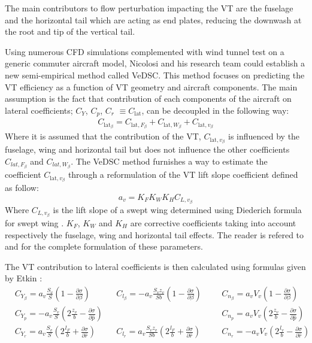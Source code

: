 The main contributors to flow perturbation impacting the VT are the fuselage and the horizontal tail which are acting as end plates, reducing the downwash at the root and tip of the vertical tail. 

Using numerous CFD simulations complemented with wind tunnel test on a generic commuter aircraft model, Nicolosi and his research team could establish a new semi-empirical method called VeDSC. This method focuses on predicting the VT efficiency as a function of VT geometry and aircraft components. The main assumption is the fact that contribution of each components of the aircraft on lateral coefficients; $C_{Y}$, $C_{p}$, $C_{r}$ $\equiv C_{\textrm{lat}}$, can be decoupled in the following way:
\begin{eqnarray}
C_{\textrm{lat}_\beta} = C_{\textrm{lat},F_\beta} + C_{\textrm{lat},W_\beta} + C_{\textrm{lat},v_\beta}
\end{eqnarray}
Where it is assumed that the contribution of the VT, $C_{\textrm{lat},v_\beta}$ is influenced by the fuselage, wing and horizontal tail but does not influence the other coefficients $C_{lat,F_\beta}$ and $C_{lat,W_\beta}$.
The VeDSC method furnishes a way to estimate the coefficient $C_{\textrm{lat},v_\beta}$ through a reformulation of the VT lift slope coefficient defined as follow:
\begin{equation}
a_v=K_F K_W K_H C_{L,v_\beta}
\end{equation}
Where $C_{L,v_\beta}$ is the lift slope of a swept wing determined using Diederich formula for swept wing \cite{DiederichPlanformParameter}. $K_F$, $K_W$ and $K_H$ are corrective coefficients taking into account respectively the fuselage, wing and horizontal tail effects. The reader is refered to \cite{NicolosiVTDesignReview} and \cite{NicolosiDirectionalStabilityReviewofEmpiricalMethod} for the complete formulation of these parameters.

The VT contribution to lateral coefficients is then calculated using formulas given by Etkin \cite{Etkin}:
\begin{align}
&C_{Y_\beta} = a_v\frac{S_v}{S}\left( 1-\frac{\partial \sigma}{\partial \beta}\right) 
&&C_{l_\beta} =-a_v\frac{S_v z_v}{S b}\left( 1-\frac{\partial \sigma}{\partial \beta}\right) 
&&&C_{n_\beta} = a_v V_v\left( 1-\frac{\partial \sigma}{\partial \beta}\right)\\
&C_{Y_p} = -a_v\frac{S_v}{S}\left(2\frac{z_v}{b}-\frac{\partial \sigma}{\partial \hat{p}}\right) && \qquad &&&C_{n_p}= a_v V_v\left(2\frac{z_v}{b}-\frac{\partial \sigma}{\partial \hat{p}}\right)\\
&C_{Y_r} = a_v\frac{S_v}{S}\left( 2\frac{l_F}{b}+\frac{\partial \sigma}{\partial \hat{r}}\right)  &&C_{l_r} =a_v\frac{S_v z_v}{S b}\left( 2\frac{l_F}{b}+\frac{\partial \sigma}{\partial \hat{r}}\right) &&&C_{n_r} = -a_v V_v\left( 2\frac{l_v}{b}-\frac{\partial \sigma}{\partial \hat{r}}\right)
\end{align}


